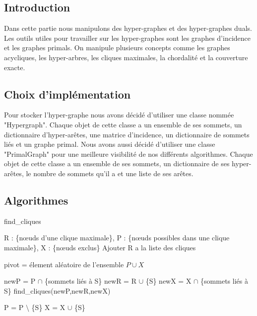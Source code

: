 \documentclass{article}
\begin{document}
	
	\subsection{Introduction}
	Dans cette partie nous manipulons des hyper-graphes et des hyper-graphes duals. Les outils utiles pour travailler sur les hyper-graphes sont les graphes d’incidence et les graphes primals. On manipule plusieurs concepts comme les graphes acycliques, les hyper-arbres, les cliques maximales, la chordalité et la couverture exacte.
	
	\subsection{Choix d'implémentation}
	Pour stocker l'hyper-graphe nous avons décidé d'utiliser une classe nommée "Hypergraph". Chaque objet de cette classe a un ensemble de ses sommets, un dictionnaire d'hyper-arêtes, une matrice d'incidence, un dictionnaire de sommets liés et un graphe primal.
	Nous avons aussi décidé d'utiliser une classe "PrimalGraph" pour une meilleure visibilité de nos différents algorithmes. Chaque objet de cette classe a un ensemble de ses sommets, un dictionnaire de ses hyper-arêtes, le nombre de sommets qu'il a et une liste de ses arêtes.	
	
	\subsection{Algorithmes}
	
		\begin{algorithm}[H]
		\caption{find\_cliques}
		\begin{algorithmic}[1]
		\REQUIRE R : \{nœuds d'une clique maximale\}, P : \{nœuds possibles dans une clique maximale\}, X : \{nœuds exclus\}
		\STATE Ajouter R a la liste des cliques
		\ENDIF
		
		\ELSE
		
		\STATE pivot = élement aléatoire de l'ensemble $P \cup X $
		
		
		\STATE newP = P $\cap$ \{sommets liés à S\}
		\STATE newR = R $\cup$ \{S\}
		\STATE newX = X $\cap$ \{sommets liés à S\}
		\STATE find\_cliques(newP,newR,newX)
		
		\STATE P = P $\setminus$ \{S\}
		\STATE X = X $\cup$ \{S\}
		\ENDFOR		
		
		\ENDIF
	
	
		\end{algorithmic}
		\end{algorithm}
\end{document}
